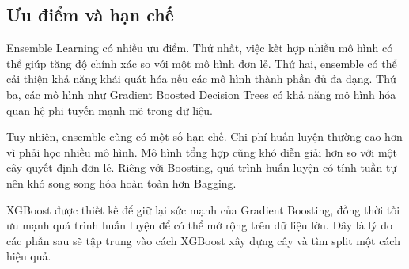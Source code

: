 \subsection{Ưu điểm và hạn chế}

Ensemble Learning có nhiều ưu điểm. Thứ nhất, việc kết hợp nhiều mô hình có thể giúp tăng độ chính xác so với một mô hình đơn lẻ. Thứ hai, ensemble có thể cải thiện khả năng khái quát hóa nếu các mô hình thành phần đủ đa dạng. Thứ ba, các mô hình như Gradient Boosted Decision Trees có khả năng mô hình hóa quan hệ phi tuyến mạnh mẽ trong dữ liệu.

Tuy nhiên, ensemble cũng có một số hạn chế. Chi phí huấn luyện thường cao hơn vì phải học nhiều mô hình. Mô hình tổng hợp cũng khó diễn giải hơn so với một cây quyết định đơn lẻ. Riêng với Boosting, quá trình huấn luyện có tính tuần tự nên khó song song hóa hoàn toàn hơn Bagging.

XGBoost được thiết kế để giữ lại sức mạnh của Gradient Boosting, đồng thời tối ưu mạnh quá trình huấn luyện để có thể mở rộng trên dữ liệu lớn. Đây là lý do các phần sau sẽ tập trung vào cách XGBoost xây dựng cây và tìm split một cách hiệu quả.
